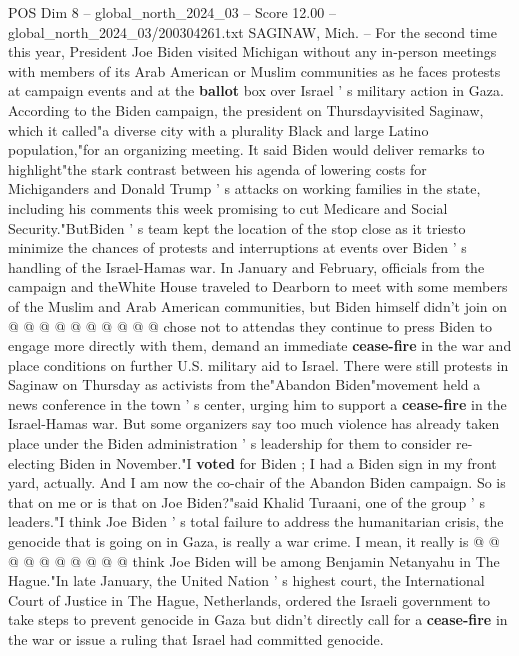 \begin{textsample}{POS Dim 8 – global\_north\_2024\_03 – Score 12.00 – global\_north\_2024\_03/200304261.txt}  \label{ex:f8_pos_009}
SAGINAW, Mich. -- For the second time this year, President Joe Biden visited Michigan without any in-person meetings with members of its Arab American or Muslim communities as he faces protests at campaign events and at the \textbf{ballot} box over Israel ' s military action in Gaza.
According to the Biden campaign, the president on Thursdayvisited Saginaw, which it called"a diverse city with a plurality Black and large Latino population,"for an organizing meeting.
It said Biden would deliver remarks to highlight"the stark contrast between his agenda of lowering costs for Michiganders and Donald Trump ' s attacks on working families in the state, including his comments this week promising to cut Medicare and Social Security."ButBiden ' s team kept the location of the stop close as it triesto minimize the chances of protests and interruptions at events over Biden ' s handling of the Israel-Hamas war.
In January and February, officials from the campaign and theWhite House traveled to Dearborn to meet with some members of the Muslim and Arab American communities, but Biden himself didn't join on @ @ @ @ @ @ @ @ @ @ chose not to attendas they continue to press Biden to engage more directly with them, demand an immediate \textbf{cease-fire} in the war and place conditions on further U.S. military aid to Israel.
There were still protests in Saginaw on Thursday as activists from the"Abandon Biden"movement held a news conference in the town ' s center, urging him to support a \textbf{cease-fire} in the Israel-Hamas war.
But some organizers say too much violence has already taken place under the Biden administration ' s leadership for them to consider re-electing Biden in November."I \textbf{voted} for Biden ; I had a Biden sign in my front yard, actually.
And I am now the co-chair of the Abandon Biden campaign.
So is that on me or is that on Joe Biden?"said Khalid Turaani, one of the group ' s leaders."I think Joe Biden ' s total failure to address the humanitarian crisis, the genocide that is going on in Gaza, is really a war crime.
I mean, it really is @ @ @ @ @ @ @ @ @ @ think Joe Biden will be among Benjamin Netanyahu in The Hague."In late January, the United Nation ' s highest court, the International Court of Justice in The Hague, Netherlands, ordered the Israeli government to take steps to prevent genocide in Gaza but didn't directly call for a \textbf{cease-fire} in the war or issue a ruling that Israel had committed genocide.

\end{textsample}

